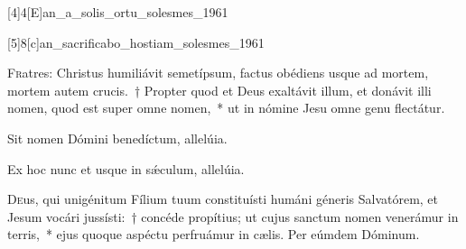 \documentclass[vesperale_romanum.tex]{subfiles}
\begin{document}
\label{111_3a2}
{}

[4]{4}[E]{an_a_solis_ortu_solesmes_1961}




[5]{8}[c]{an_sacrificabo_hostiam_solesmes_1961}




\lettrine{F}{r}atres: Christus humiliávit semetípsum, factus obédiens usque ad mortem, mortem autem crucis.~† Propter quod et Deus exaltávit illum, et donávit illi nomen, quod est super omne nomen,~* ut in nómine Jesu omne genu flectátur.

\hymnus


\vv Sit nomen Dómini benedíctum, allelúia.

\rr Ex hoc nunc et usque in sǽculum, allelúia.


\oratio

\lettrine{D}{e}us, qui unigénitum Fílium tuum constituísti humáni géneris Salvatórem, et Jesum vocári jussísti:~† concéde propítius; ut cujus sanctum nomen venerámur in terris,~* ejus quoque aspéctu perfruámur in cælis. Per eúmdem Dóminum.



\omniapraeter



\simplex

%
%
\end{document}
